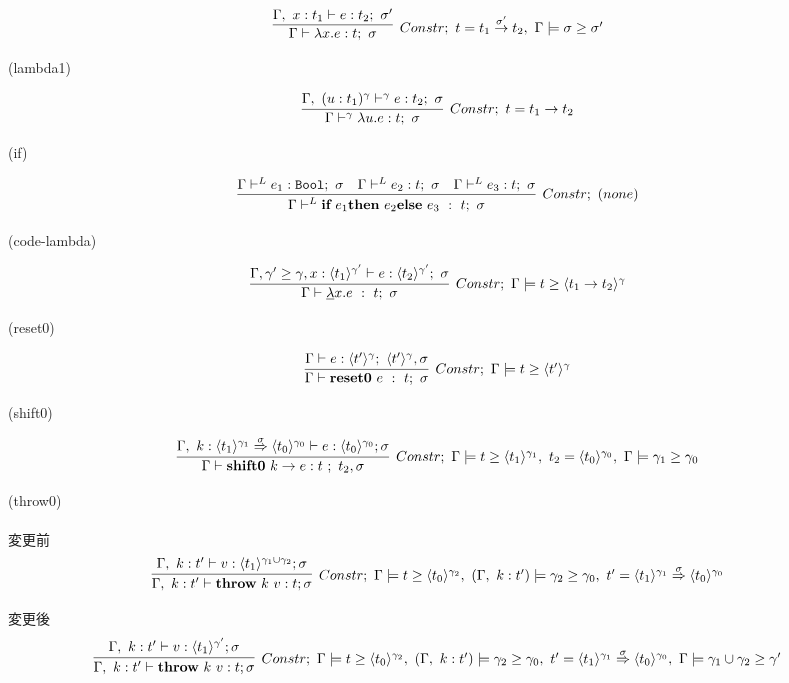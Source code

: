 \documentclass[dvipdfmx]{jsarticle}
\newcommand\longer[2]{{#1} \ord {#2}}
\newcommand\Bool{\mbox{\texttt{Bool}}}
\newcommand\uni{\cup} %
\begin{document}
\[
  \infer[Constr;~t=\funT{t_1}{t_2}{\sigma'},~ \Gamma \models \sigma \ord \sigma' ]
  {\Gamma \vdash \lambda x.e : t;~\sigma}
  {\Gamma,~x:t_1 \vdash e : t_2;~\sigma'}
\]

(lambda1) \\

\[
  \infer[Constr;~t=\funT{t_1}{t_2}{}]
  {\Gamma \vdash^\gamma \lambda u.e : t;~\sigma}
  {\Gamma,~(u:t_1)^\gamma \vdash^\gamma e : t_2;~\sigma}
\]

(if)

\[
  \infer[Constr;~(none)]
  {\Gamma \vdash^L
    \textbf{if}~e_1 \textbf{then}~e_2 \textbf{else}~e_3 ~:~t; ~ \sigma}
  {\Gamma \vdash^L e_1 : \Bool;~\sigma
    &\Gamma \vdash^L e_2 : t;~\sigma
    &\Gamma \vdash^L e_3 : t;~\sigma
  }
\]

(code-lambda)

\[
  \infer[Constr;~\Gamma \models \longer{t}{\codeT{t_1 \to t_2}{\gamma}}]
  {\Gamma \vdash \underline{\lambda}x.e ~:~t;~\sigma}
  {\Gamma,\longer{\gamma'}{\gamma},x:\codeT{t_1}{\gamma'}
    \vdash e : \codeT{t_2}{\gamma'};~\sigma
  }
\]

(reset0)

\[
  \infer[Constr;~\Gamma \models \longer{t}{\codeT{t'}{\gamma}}]
  {\Gamma \vdash \Resetz~e ~:~ t; ~\sigma}
  {\Gamma \vdash e:\codeT{t'}{\gamma};~\codeT{t'}{\gamma},\sigma
  }
\]

(shift0)

\[
  \infer[Constr;~\Gamma \models \longer{t}{\codeT{t_1}{\gamma_1}},~ t_2 =\codeT{t_0}{\gamma_0},~ \Gamma \models \longer{\gamma_1}{\gamma_0}]
  {\Gamma \vdash \shiftz{k}{e} : t~;~ t_2,\sigma}
  {\Gamma,~k:\contT{\codeT{t_1}{\gamma_1}}{\codeT{t_0}{\gamma_0}}{\sigma}
    \vdash e : \codeT{t_0}{\gamma_0} ; \sigma
  }
\]


(throw0)\\
\\
変更前
\[
  \infer[Constr;~ \Gamma \models \longer{t}{\codeT{t_0}{\gamma_2}},~ (\Gamma,~ k:t') \models \gamma_2 \ord \gamma_0,~  t' = \contT{\codeT{t_1}{\gamma_1}}{\codeT{t_0}{\gamma_0}}{\sigma}]
  {\Gamma,~ k:t'
    \vdash \throw{k}{v} : t ; \sigma}
  {\Gamma,~ k:t'
    \vdash v : \codeT{t_1}{\gamma_1 \uni \gamma_2} ; \sigma
  }
\]

変更後
\[
  \infer[Constr;~ \Gamma \models \longer{t}{\codeT{t_0}{\gamma_2}},~ (\Gamma,~ k:t') \models \gamma_2 \ord \gamma_0,~  t' = \contT{\codeT{t_1}{\gamma_1}}{\codeT{t_0}{\gamma_0}}{\sigma},~ \Gamma \models \gamma_1 \uni \gamma_2 \ord \gamma']
  {\Gamma,~ k:t'
    \vdash \throw{k}{v} : t ; \sigma}
  {\Gamma,~ k:t'
    \vdash v : \codeT{t_1}{\gamma'} ; \sigma
  }
\]
\end{document}
